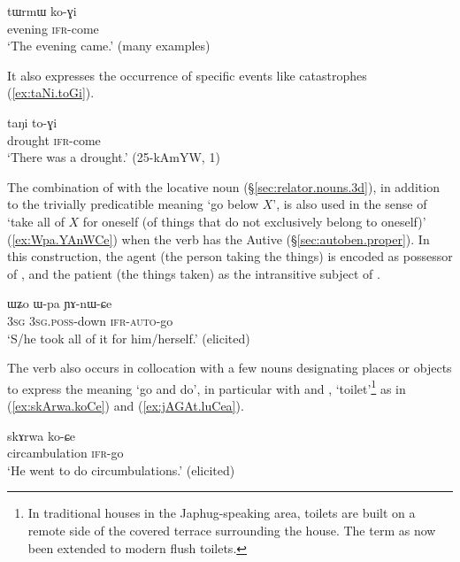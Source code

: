 \begin{exe}
\ex \label{ex:tWrmW.koGi}
\gll tɯrmɯ ko-ɣi  \\
evening \textsc{ifr}-come \\
\glt `The evening came.' (many examples)
\end{exe}

It also expresses the occurrence of  specific events like catastrophes (\ref{ex:taNi.toGi}).

\begin{exe}
\ex \label{ex:taNi.toGi}
\gll taŋi to-ɣi \\
drought \textsc{ifr}-come \\
\glt `There was a drought.' (25-kAmYW, 1)
\end{exe}

The combination of  with the locative noun  (§\ref{sec:relator.nouns.3d}), in addition to the trivially predicatible meaning `go below $X$', is also used in the sense of `take all of $X$ for oneself (of things that do not exclusively belong to oneself)' (\ref{ex:Wpa.YAnWCe}) when the verb has the Autive  (§\ref{sec:autoben.proper}). In this construction, the agent (the person taking the things) is encoded as possessor of , and the patient (the things taken) as the intransitive subject of .


\begin{exe}
\ex \label{ex:Wpa.YAnWCe}
\gll ɯʑo ɯ-pa ɲɤ-nɯ-ɕe \\
\textsc{3sg} \textsc{3sg}.\textsc{poss}-down \textsc{ifr}-\textsc{auto}-go \\
\glt `S/he took all of it for him/herself.' (elicited)
\end{exe}

The verb  also occurs in collocation with a few nouns designating places or objects to express the meaning `go and do', in particular with  and , `toilet'\footnote{In traditional houses in the Japhug-speaking area, toilets are built on a remote side of the covered terrace surrounding the house. The term as now been extended to modern flush toilets.} as in (\ref{ex:skArwa.koCe}) and (\ref{ex:jAGAt.luCea}).

 \begin{exe}
	\ex \label{ex:skArwa.koCe}
	\gll skɤrwa ko-ɕe \\
	circambulation \textsc{ifr}-go \\
	\glt `He went to do circumbulations.' (elicited)
\end{exe}

